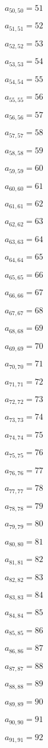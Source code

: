 \documentclass[a4paper,12pt]{article}
\begin{document}
$a _{ 50, 50 } = 51$

$a _{ 51, 51 } = 52$

$a _{ 52, 52 } = 53$

$a _{ 53, 53 } = 54$

$a _{ 54, 54 } = 55$

$a _{ 55, 55 } = 56$

$a _{ 56, 56 } = 57$

$a _{ 57, 57 } = 58$

$a _{ 58, 58 } = 59$

$a _{ 59, 59 } = 60$

$a _{ 60, 60 } = 61$

$a _{ 61, 61 } = 62$

$a _{ 62, 62 } = 63$

$a _{ 63, 63 } = 64$

$a _{ 64, 64 } = 65$

$a _{ 65, 65 } = 66$

$a _{ 66, 66 } = 67$

$a _{ 67, 67 } = 68$

$a _{ 68, 68 } = 69$

$a _{ 69, 69 } = 70$

$a _{ 70, 70 } = 71$

$a _{ 71, 71 } = 72$

$a _{ 72, 72 } = 73$

$a _{ 73, 73 } = 74$

$a _{ 74, 74 } = 75$

$a _{ 75, 75 } = 76$

$a _{ 76, 76 } = 77$

$a _{ 77, 77 } = 78$

$a _{ 78, 78 } = 79$

$a _{ 79, 79 } = 80$

$a _{ 80, 80 } = 81$

$a _{ 81, 81 } = 82$

$a _{ 82, 82 } = 83$

$a _{ 83, 83 } = 84$

$a _{ 84, 84 } = 85$

$a _{ 85, 85 } = 86$

$a _{ 86, 86 } = 87$

$a _{ 87, 87 } = 88$

$a _{ 88, 88 } = 89$

$a _{ 89, 89 } = 90$

$a _{ 90, 90 } = 91$

$a _{ 91, 91 } = 92$
\end{document}
